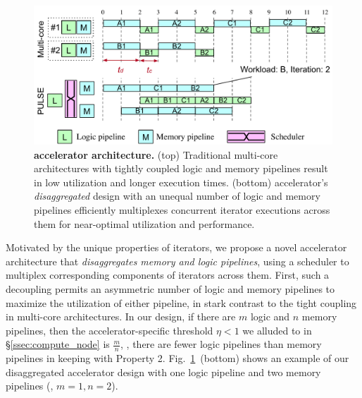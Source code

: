 \begin{figure}[t]
  \centering
  \includegraphics[width=0.9\columnwidth]{fig/pulse/architecture.pdf}
  \vspace{-0.5em}
  \caption[\pulse accelerator architecture]{\textbf{\pulse accelerator architecture.} (top) Traditional multi-core architectures with tightly coupled logic and memory pipelines result in low utilization and longer execution times. (bottom) \pulse accelerator's \emph{disaggregated} design with an unequal number of logic and memory pipelines efficiently multiplexes concurrent iterator executions across them for near-optimal utilization and performance.}
  \label{fig:architecture_overview}%
\end{figure} 

 Motivated by the unique properties of iterators, we propose a novel accelerator architecture that \emph{disaggregates memory and logic pipelines}, using a scheduler to multiplex corresponding components of iterators across them. First, such a decoupling permits an asymmetric number of logic and memory pipelines to maximize the utilization of either pipeline, in stark contrast to the tight coupling in multi-core architectures. In our design, if there are $m$ logic and $n$ memory pipelines, then the accelerator-specific threshold $\eta < 1$ we alluded to in  \S\ref{ssec:compute_node} is $\frac{m}{n}$, \ie, there are fewer logic pipelines than memory pipelines in keeping with Property 2. Fig.~\ref{fig:architecture_overview}~(bottom) shows an example of our disaggregated accelerator design with one logic pipeline and two memory pipelines (\ie, $m=1, n=2$). 

